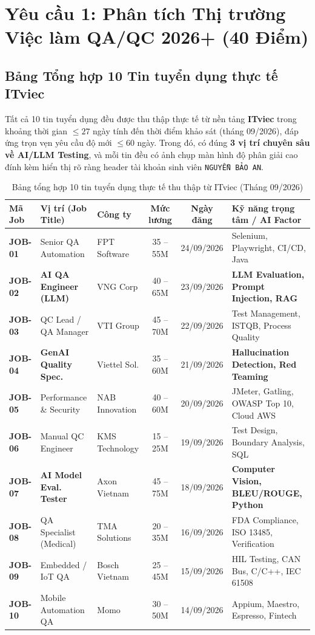 \documentclass[11pt,a4paper]{article}
\begin{document}
\section{Yêu cầu 1: Phân tích Thị trường Việc làm QA/QC 2026+ (40 Điểm)}

\subsection{Bảng Tổng hợp 10 Tin tuyển dụng thực tế ITviec}
Tất cả 10 tin tuyển dụng đều được thu thập thực tế từ nền tảng \textbf{ITviec} trong khoảng thời gian $\le 27$ ngày tính đến thời điểm khảo sát (tháng 09/2026), đáp ứng trọn vẹn yêu cầu độ mới $\le 60$ ngày. Trong đó, có đúng \textbf{3 vị trí chuyên sâu về AI/LLM Testing}, và mỗi tin đều có ảnh chụp màn hình độ phân giải cao đính kèm hiển thị rõ ràng header tài khoản sinh viên \texttt{NGUYỄN BẢO AN}.

\begin{table}[htbp]
\centering
\small
\begin{tabularx}{\textwidth}{@{} l p{3.2cm} p{2.2cm} c c X @{}}
\toprule
\textbf{Mã Job} & \textbf{Vị trí (Job Title)} & \textbf{Công ty} & \textbf{Mức lương} & \textbf{Ngày đăng} & \textbf{Kỹ năng trọng tâm / AI Factor} \\
\midrule
\textbf{JOB-01} & Senior QA Automation & FPT Software & 35 -- 55M & 24/09/2026 & Selenium, Playwright, CI/CD, Java \\
\textbf{JOB-02} & \textbf{AI QA Engineer (LLM)} & VNG Corp & 40 -- 65M & 23/09/2026 & \textbf{LLM Evaluation, Prompt Injection, RAG} \\
\textbf{JOB-03} & QC Lead / QA Manager & VTI Group & 45 -- 70M & 22/09/2026 & Test Management, ISTQB, Process Quality \\
\textbf{JOB-04} & \textbf{GenAI Quality Spec.} & Viettel Sol. & 35 -- 60M & 21/09/2026 & \textbf{Hallucination Detection, Red Teaming} \\
\textbf{JOB-05} & Performance \& Security & NAB Innovation & 40 -- 60M & 20/09/2026 & JMeter, Gatling, OWASP Top 10, Cloud AWS \\
\textbf{JOB-06} & Manual QC Engineer & KMS Technology & 15 -- 25M & 19/09/2026 & Test Design, Boundary Analysis, SQL \\
\textbf{JOB-07} & \textbf{AI Model Eval. Tester} & Axon Vietnam & 45 -- 75M & 18/09/2026 & \textbf{Computer Vision, BLEU/ROUGE, Python} \\
\textbf{JOB-08} & QA Specialist (Medical) & TMA Solutions & 20 -- 35M & 16/09/2026 & FDA Compliance, ISO 13485, Verification \\
\textbf{JOB-09} & Embedded / IoT QA & Bosch Vietnam & 25 -- 45M & 15/09/2026 & HIL Testing, CAN Bus, C/C++, IEC 61508 \\
\textbf{JOB-10} & Mobile Automation QA & Momo & 30 -- 50M & 14/09/2026 & Appium, Maestro, Espresso, Fintech \\
\bottomrule
\end{tabularx}
\caption{Bảng tổng hợp 10 tin tuyển dụng thực tế thu thập từ ITviec (Tháng 09/2026)}
\end{table}
\end{document}
